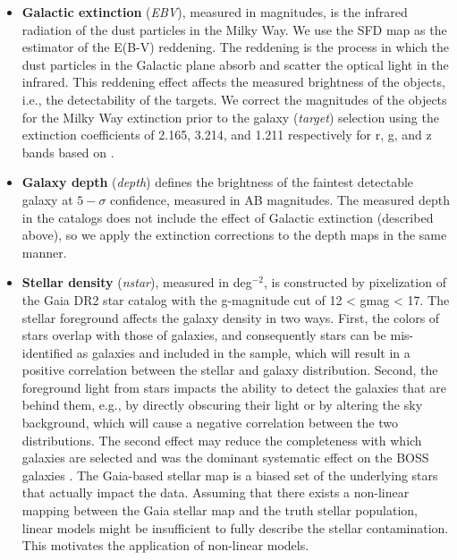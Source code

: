 \begin{itemize}
    \item \textbf{Galactic extinction} (\textit{EBV}), measured in magnitudes, is the infrared radiation of the dust particles in the Milky Way. We use the SFD map \citep{schlegel1998maps} as the estimator of the E(B-V) reddening. The reddening is the process in which the dust particles in the Galactic plane absorb and scatter the optical light in the infrared. This reddening effect affects the measured brightness of the objects, i.e., the detectability of the targets. We correct the magnitudes of the objects for the Milky Way extinction prior to the galaxy (\textit{target}) selection using the extinction coefficients of 2.165, 3.214, and 1.211 respectively for r, g, and z bands based on \citet{schlafly2011measuring}.\\
    
    \item \textbf{Galaxy depth} (\textit{depth}) defines the brightness of the faintest detectable galaxy at $5-\sigma$ confidence, measured in AB magnitudes. The measured depth in the catalogs does not include the effect of Galactic extinction (described above), so we apply the extinction corrections to the depth maps in the same manner.\\
    
    \item {\bf Stellar density} (\textit{nstar}), measured in deg$^{-2}$, is constructed by pixelization of the Gaia DR2 star catalog \citep{brown2018gaia} with the g-magnitude cut of 12 < gmag < 17. The stellar foreground affects the galaxy density in two ways. First, the colors of stars overlap with those of galaxies, and consequently stars can be mis-identified as galaxies and included in the sample, which will result in a positive correlation between the stellar and galaxy distribution. Second, the foreground light from stars impacts the ability to detect the galaxies that are behind them, e.g., by directly obscuring their light or by altering the sky background, which will cause a negative correlation between the two distributions. The second effect may reduce the completeness with which galaxies are selected and was the dominant systematic effect on the BOSS galaxies \citep{ashley2012MNRAS}. The Gaia-based stellar map is a biased set of the underlying stars that actually impact the data. Assuming that there exists a non-linear mapping between the Gaia stellar map and the truth stellar population, linear models might be insufficient to fully describe the stellar contamination. This motivates the application of non-linear models.\\
    

\end{itemize}
